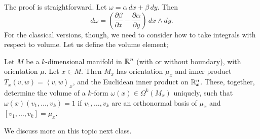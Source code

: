 \noindent The proof is straightforward. Let $\omega = \alpha \, dx + \beta \, dy$. Then
\[ d\omega = \left(\frac{\partial \beta}{\partial x} - \frac{\partial \alpha}{\partial y}\right) \, dx \wedge dy. \]
For the classical versions, though, we need to consider how to take integrals with respect to volume. Let us define the volume element;
\begin{definition}
    Let $M$ be a $k$-dimensional manifold in $\mathbb R^n$ (with or without boundary), with orientation $\mu$. Let $x \in M$. Then $M_x$ has orientation $\mu_x$ and inner product $T_x(v, w) = \left<v, w\right>_x$, and the Euclidean inner product on $\mathbb R_x^n$. These, together, determine the volume of a $k$-form $\omega(x) \in \Omega^k(M_x)$ uniquely, such that $\omega(x)(v_1, \dots, v_k) = 1$ if $v_1, \dots, v_k$ are an orthonormal basis of $\mu_x$ and $[v_1, \dots, v_k] = \mu_x$.
\end{definition}
\noindent We discuss more on this topic next class.